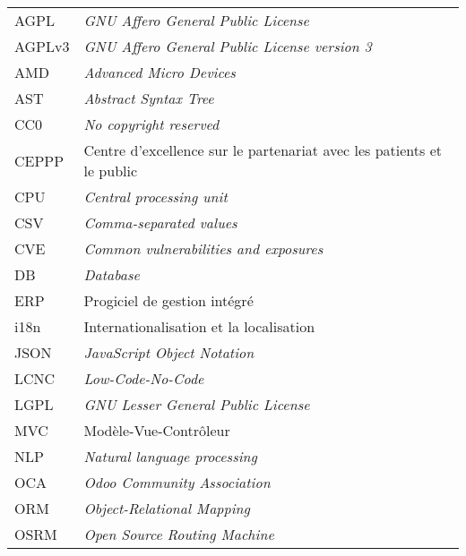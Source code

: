 \chapter*{\abbrevname}
\pagestyle{pagenumber}
%
\begin{acronym}
\end{acronym}
%
\begin{longtable}{lp{5in}}
AGPL      & \textit{GNU Affero General Public License}\\
AGPLv3    & \textit{GNU Affero General Public License version 3}\\
AMD       & \textit{Advanced Micro Devices}\\
AST       & \textit{Abstract Syntax Tree}\\
CC0       & \textit{No copyright reserved}\\
CEPPP     & Centre d'excellence sur le partenariat avec les patients et le public\\
CPU       & \textit{Central processing unit}\\
CSV       & \textit{Comma-separated values}\\
CVE       & \textit{Common vulnerabilities and exposures}\\
DB        & \textit{Database}\\
ERP       & Progiciel de gestion intégré\\
i18n      & Internationalisation et la localisation\\
JSON      & \textit{JavaScript Object Notation}\\
LCNC      & \textit{Low-Code-No-Code}\\
LGPL      & \textit{GNU Lesser General Public License}\\
MVC       & Modèle-Vue-Contrôleur\\
NLP       & \textit{Natural language processing}\\
OCA       & \textit{Odoo Community Association}\\
ORM       & \textit{Object-Relational Mapping}\\
OSRM      & \textit{Open Source Routing Machine}\\

\end{longtable}

